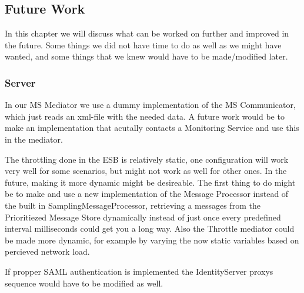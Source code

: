 \subsection{Future Work}\label{Future Work}
    In this chapter we will discuss what can be worked on further and improved in the future. Some things we did not have time to do as well as we might have wanted, and some things that we knew would have to be made/modified later.
    
    \subsubsection{Server}\label{Future:Server}
        In our MS Mediator we use a dummy implementation of the MS Communicator, which just reads an xml-file with the needed data. A future work would be to make an implementation that acutally contacts a Monitoring Service and use this in the mediator.

        The throttling done in the ESB is relatively static, one configuration will work very well for some scenarios, but might not work as well for other ones. In the future, making it more dynamic might be desireable. The first thing to do might be to make and use a new implementation of the Message Processor instead of the built in SamplingMessageProcessor, retrieving a messages from the Prioritiezed Message Store dynamically instead of just once every predefined interval milliseconds could get you a long way. Also the Throttle mediator could be made more dynamic, for example by varying the now static variables based on percieved network load.

        If propper SAML authentication is implemented the IdentityServer proxys sequence would have to be modified as well.